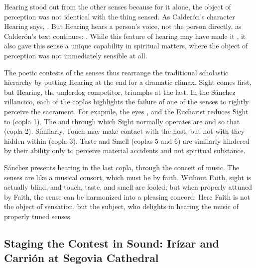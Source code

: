 Hearing stood out from the other senses because for it alone, the object of perception was not identical with the thing sensed.
As Calderón's character Hearing says, .%
\Autocite[]{Calderon:Retiro}
But Hearing hears a person's voice, not the person directly, as Calderón's text continues: .%
\Autocite[]{Calderon:Retiro}
While this feature of hearing may have made it , it also gave this sense a unique capability in spiritual matters, where the object of perception was not immediately sensible at all.

The poetic contests of the senses thus rearrange the traditional scholastic hierarchy by putting Hearing at the end for a dramatic climax.
Sight comes first, but Hearing, the underdog competitor, triumphs at the last.
In the Sánchez villancico, each of the coplas highlights the failure of one of the senses to rightly perceive the sacrament.
For exapmle, the eyes , and the Eucharist reduces Sight to  (copla 1).
The  and  through which Sight normally operates are   and  so that  (copla 2).
Similarly, Touch may make contact with the host, but not with they  hidden within (copla 3).
Taste and Smell (coplas 5 and 6) are similarly hindered by their ability only to perceive material accidents and not spiritual substance.

Sánchez presents hearing in the last copla, through the conceit of music.
The senses are  like a musical consort, which must be  by faith.
Without Faith, sight is actually blind, and touch, taste, and smell are fooled; but when properly attuned by Faith, the sense can be harmonized into a pleasing concord.
Here Faith is not the object of sensation, but the subject, who delights in hearing the music of properly tuned senses.

\subsection{Staging the Contest in Sound: Irízar and Carrión at Segovia Cathedral}

